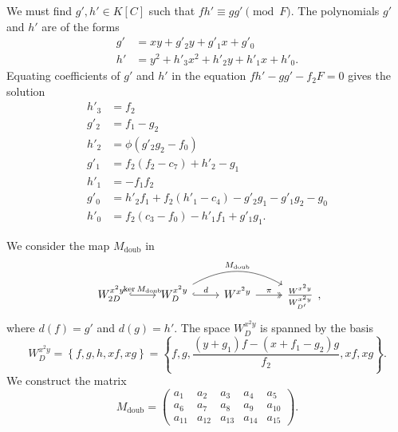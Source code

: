 We must find $g', h' \in K[C]$ such that $fh' \equiv gg' \pmod F$.
The polynomials $g'$ and $h'$ are of the forms
\begin{align*}
  g' &= xy            + g'_2y + g'_1x + g'_0 \\
  h' &= y^2 + h'_3x^2 + h'_2y + h'_1x + h'_0.
\end{align*}
Equating coefficients of $g'$ and $h'$ in the equation $fh' - gg' - f_2F = 0$
gives the solution
\begin{align*}
  h'_3 &= f_2 \\
  g'_2 &= f_1 - g_2 \\
  h'_2 &= \phi(g'_2g_2 - f_0) \\ 
  g'_1 &= f_2(f_2 - c_7) + h'_2 - g_1 \\
  h'_1 &= -f_1f_2 \\
  g'_0 &= h'_2f_1 + f_2(h'_1 - c_4) - g'_2g_1 - g'_1g_2 - g_0 \\
  h'_0 &= f_2(c_3 - f_0) - h'_1f_1 + g'_1g_1.
\end{align*}
\begin{comment}
\begin{align*}
  h'_3 &= f_2 \\
  g'_2 &= - c_8f_2 + f_1 - g_2 \\
  h'_2 &= c_5 + \phi(g'_2g_2 - f_0) \\ 
  g'_1 &= f_2(f_2 - c_7) + h'_2 - g_1 \\
  h'_1 &= f_2(c_6 - f_1) \\
  g'_0 &= h'_2f_1 + f_2(h'_1 - c_4) - g'_2g_1 - g'_1g_2 - g_0 \\
  h'_0 &= f_2(c_3 - f_0) - h'_1f_1 + g'_1g_1.
\end{align*}
\end{comment}
We consider the map $M_{\text{doub}}$ in 
\[  \begin{tikzcd}
      W_{2D}^{x^2y} \arrow[hook]{r}{\ker M_{\text{doub}}} & 
      W_D^{x^2y} \arrow[hook]{r}{d} \arrow[bend left]{rr}{M_{\text{doub}}} & 
      W^{x^2y} \arrow[two heads]{r}{\pi} & 
      \frac {W^{x^2y}} {W_{D'}^{x^2y}}
    \end{tikzcd}, \]
where $d(f) = g'$ and $d(g) = h'$.
The space $W_D^{x^2y}$ is spanned by the basis
  \[ W_D^{x^2y} = \left\{ f,g,h,xf,xg \right\} = \left\{ f,g,\frac{(y + g_1)f - (x + f_1 - g_2)g}{f_2},xf,xg \right\}. \]
We construct the matrix 
\[ M_{\text{doub}} =
\begin{pmatrix}
  a_1 & a_2 & a_3 & a_4 & a_5 \\
  a_6 & a_7 & a_8 & a_9 & a_{10} \\
  a_{11} & a_{12} & a_{13} & a_{14} & a_{15}
\end{pmatrix}. \]
